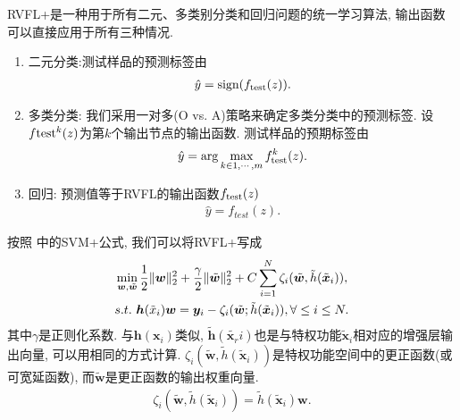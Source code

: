 RVFL+是一种用于所有二元、多类别分类和回归问题的统一学习算法, 输出函数可以直接应用于所有三种情况.
\begin{enumerate}
    \item 二元分类:测试样品的预测标签由
\begin{align}
    \hat y = \textup{sign}(f_{\textup{test}}(z)).
\end{align}
    \item 多类分类: 我们采用一对多(O vs. A)策略来确定多类分类中的预测标签. 设$f{\textup{test}}^k(z)$为第$k$个输出节点的输出函数. 测试样品的预期标签由
\begin{align}
    \hat y = \arg \max_{ k \in 1,\cdots,m} f_{\textup{test}}^k (z).
\end{align}
  \item  回归: 预测值等于RVFL的输出函数$f_{\textup{test}}(z)$
\begin{align}
    \hat y = f_{test}(z).
\end{align}
\end{enumerate}

按照 \cite{VAPNIK2009544} 中的SVM+公式, 我们可以将RVFL+写成
\begin{align}
    &\min\limits_{{\bm w},\tilde {\bm w}} \frac 1 2 \|{\bm w}\|_2^ 2 + \frac \gamma 2 \|\tilde {\bm w}\|_2^ 2 + C\sum_{i=1}^N \zeta_i (\tilde {\bm w}, {\tilde h}({\tilde {\bm x}}_i)),\notag\\
    &s.t.\,\, \bm h(\tilde x_i){\bm w} = \bm y_i - \zeta_i (\tilde {\bm w}; {\tilde h}({\tilde {\bm x}}_i)), \forall \leq i \leq  N.
    \label{RVFL20181102eq8}
\end{align}
其中$\gamma$是正则化系数. 与$\bm h(\bm x_i)$类似, ${\tilde{\bm h}}({\tilde{\bm x_r}}i)$也是与特权功能${\tilde{\bm x}_i}$相对应的增强层输出向量, 可以用相同的方式计算.
$\zeta_i(\tilde{\bm w},{\tilde h}(\tilde{\bm x}_i))$是特权功能空间中的更正函数(或可宽延函数), 而$\tilde{\bm w}$是更正函数的输出权重向量.
\begin{align}\label{RVFL20181102eq9}
    \zeta_i (\tilde {\bm w}, {\tilde h}({\tilde {\bm x}}_i)) = {\tilde h}({\tilde {\bm x}}_i){\bm w}.
\end{align}

